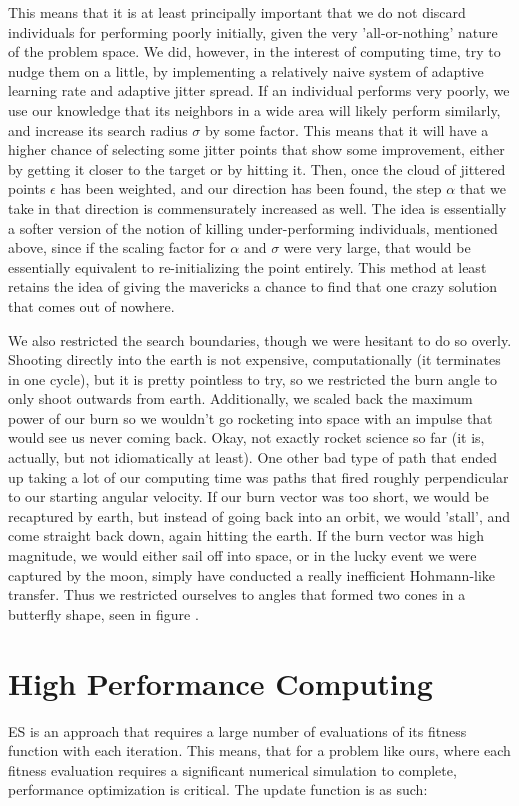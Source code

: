 This means that it is at least principally important that we do not discard individuals for performing poorly initially, given the very 'all-or-nothing' nature of the problem space. We did, however, in the interest of computing time, try to nudge them on a little, by implementing a relatively naive system of adaptive learning rate and adaptive jitter spread. If an individual performs very poorly, we use our knowledge that its neighbors in a wide area will likely perform similarly, and increase its search radius $\sigma$ by some factor. This means that it will have a higher chance of selecting some jitter points that show some improvement, either by getting it closer to the target or by hitting it. Then, once the cloud of jittered points $\epsilon$ has been weighted, and our direction has been found, the step $\alpha$ that we take in that direction is commensurately increased as well. The idea is essentially a softer version of the notion of killing under-performing individuals, mentioned above, since if the scaling factor for $\alpha$ and $\sigma$ were very large, that would be essentially equivalent to re-initializing the point entirely. This method at least retains the idea of giving the mavericks a chance to find that one crazy solution that comes out of nowhere.

We also restricted the search boundaries, though we were hesitant to do so overly. Shooting directly into the earth is not expensive, computationally (it terminates in one cycle), but it is pretty pointless to try, so we restricted the burn angle to only shoot outwards from earth. Additionally, we scaled back the maximum power of our burn so we wouldn't go rocketing into space with an impulse that would see us never coming back. Okay, not exactly rocket science so far (it is, actually, but not idiomatically at least). One other bad type of path that ended up taking a lot of our computing time was paths that fired roughly perpendicular to our starting angular velocity. If our burn vector was too short, we would be recaptured by earth, but instead of going back into an orbit, we would 'stall', and come straight back down, again hitting the earth. If the burn vector was high magnitude, we would either sail off into space, or in the lucky event we were captured by the moon, simply have conducted a really inefficient Hohmann-like transfer. Thus we restricted ourselves to angles that formed two cones in a butterfly shape, seen in figure .

\section{High Performance Computing}
ES is an approach that requires a large number of evaluations of its fitness function with each iteration. This means, that for a problem like ours, where each fitness evaluation requires a significant numerical simulation to complete, performance optimization is critical. The update function is as such:

